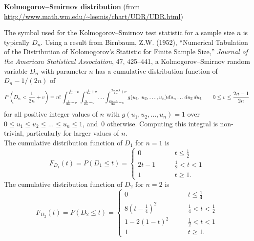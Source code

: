 \documentclass[12pt,fullpage]{article}
\begin{document}
\noindent
{\bf Kolmogorov--Smirnov distribution} (from \color{blue}\url{http://www.math.wm.edu/~leemis/chart/UDR/UDR.html}\color{black})

\noindent
The symbol used for the Kolmogorov--Smirnov test statistic for a sample size $n$ is typically $D_n$.
Using a result from Birnbaum, Z.W. (1952), ``Numerical Tabulation of the Distribution of Kolomogorov's
Statistic for Finite Sample Size,'' {\emph{Journal of the American Statistical Association}},
47, 425--441, a Kolmogorov--Smirnov random variable $D_n$ with parameter $n$ has a cumulative distribution function 
of $D_n - 1/(2n)$ of
$$
P\left(D_n < \frac{1}{2n} + v \right) = n! \, \int_{\frac{1} {2n} - v} ^ {\frac{1} {2n} + v} \int_{\frac{3} {2n} - v} ^ {\frac{3} {2n} + v}\ldots 
\int_{\frac{2n - 1} {2n} - v} ^ {\frac{2n - 1} {2n} + v} g(u_1,\, u_2, \ldots, u_n) \kern 0.08 em du_n \ldots du_2\, du_1 \qquad 0 \leq v \leq \frac{2n - 1}{2n}
$$
for all positive integer values of
$n$ with $g(u_1, u_2, \ldots, u_n) = 1$ over
$0 \leq u_1 \leq u_2 \leq \ldots \leq u_n \leq 1$, and~$0$ otherwise.
Computing this integral is non-trivial, particularly for larger values of $n$.  \\

The cumulative distribution function of $D_1$ for $n=1$ is
$$
F_{D_1}(t) = P(D_1 \le t) = \left\{ \begin{array}{ll}
                                      0 & \qquad t \le \frac{1}{2} \\ [0.5em]
                                      2t - 1 & \qquad \frac{1}{2} < t < 1\\ [0.5em]
                                      1 & \qquad t \ge 1.
                        \end{array} \right.
$$
The cumulative distribution function of $D_2$ for $n=2$ is 
$$ 
F_{D_2}(t) = P(D_2 \le t) = \left\{ \begin{array}{ll}
                                      0 & \qquad t \le \frac{1}{4} \\ [0.5em]
                                      8 \left(t - \frac{1}{4} \right)^2 & \qquad \frac{1}{4} < t < \frac{1}{2} \\ [0.5em]
                                      1 - 2 (1 - t) ^ 2 & \qquad \frac{1}{2} < t < 1 \\ [0.5em]
                                      1 & \qquad t \ge 1.
                        \end{array} \right.
$$
\end{document}

